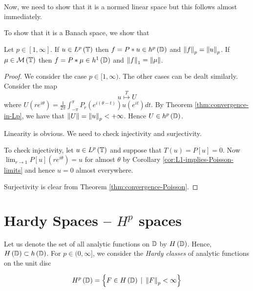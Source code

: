 Now, we need to show that it is a normed linear space but this follows almost immediately.

To show that it is a Banach space, we show that

\begin{theorem}
    Let $p\in [1, \infty]$. If $u\in L^{p} \left( \mathbb T \right)$ then $f=P * u \in h^{p} \left( \mathbb D \right)$ and $\left\lVert f \right\rVert_{p} =\left\lVert u \right\rVert_{p}$. If $\mu \in {\cal M} \left( \mathbb T \right)$ then $f= P * \mu \in h^{1} \left( \mathbb D \right)$ and $\left\lVert f \right\rVert_{1} = \left\lVert \mu \right\rVert$.
    \label{thm:lp-and-hp}
\end{theorem}
\begin{proof}
    We consider the case $p \in [1, \infty )$. The other cases can be dealt similarly. Consider the map 
    \begin{equation*}
	u \stackrel{T}{\mapsto} U
    \end{equation*}
    where $U\left( re^{i\theta} \right) = \frac{1}{2\pi} \int_{-\pi}^{\pi} P_{r}\left( e^{i(\theta-t)} \right) u \left( e^{it} \right) dt$. By Theorem \ref{thm:convergence-in-Lp}, we have that $\left\lVert U \right\rVert = \left\lVert u \right\rVert_{p} < +\infty$. Hence $U \in h^{p} \left( \mathbb D \right)$.

    Linearity is obvious. We need to check injectivity and surjectivity.

    To check injectivity, let $u \in L^{p} \left( \mathbb T \right)$ and suppose that $T(u)=P[u]=0$. Now $\lim_{r\to 1} P[u] \left( re^{i\theta} \right) = u$ for almost $\theta$ by Corollary \ref{cor:L1-implies-Poisson-limits} and hence $u=0$ almost everywhere.

    Surjectivity is clear from Theorem \ref{thm:convergence-Poisson}.
    \end{proof}


\section{Hardy Spaces -- \texorpdfstring{$H^p$}{} spaces}

Let us denote the set of all analytic functions on $\mathbb D$ by $H \left( \mathbb D \right)$. Hence, $H \left( \mathbb D \right) \subset h \left( \mathbb D \right)$. For $p\in (0,\infty]$, we consider the \textit{Hardy classes} of analytic functions on the unit disc

\begin{equation*}
    H^{p} \left( \mathbb D \right) = \left\{ F \in H \left( \mathbb D \right) \, \mid \, \left\lVert F \right\rVert _{p} < \infty \right\}
\end{equation*}

